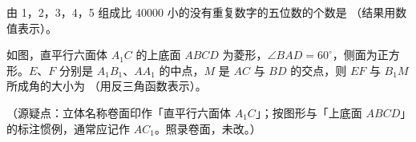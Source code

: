 \begin{question}
由 1，2，3，4，5 组成比 40000 小的没有重复数字的五位数的个数是 \gkblank{}（结果用数值表示）。

\Needspace{0.4\textheight}
\end{question}
\begin{question}
如图，直平行六面体 $A_{1}C$ 的上底面 $ABCD$ 为菱形，$\angle BAD=60^{\circ}$，侧面为正方形。$E$、$F$ 分别是 $A_{1}B_{1}$、$AA_{1}$ 的中点，$M$ 是 $AC$ 与 $BD$ 的交点，则 $EF$ 与 $B_{1}M$ 所成角的大小为 \gkblank{}（用反三角函数表示）。
\nopagebreak[4]
\begin{center}\end{center}
\nopagebreak[4]
（源疑点：立体名称卷面印作「直平行六面体 $A_{1}C$」；按图形与「上底面 $ABCD$」的标注惯例，通常应记作 $AC_{1}$。照录卷面，未改。）

\end{question}

